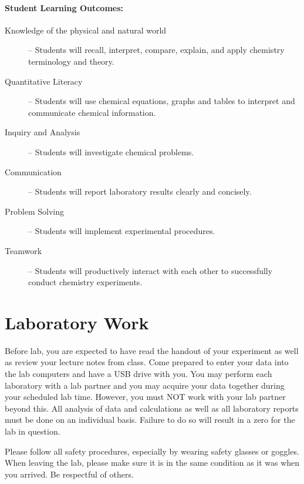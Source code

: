 \documentclass[12pt, letterpaper]{article}
\begin{document}
\paragraph{Student Learning Outcomes:}
\begin{description}
	\item[Knowledge of the physical and natural world] -- Students will recall, interpret, compare, explain, and apply chemistry terminology and theory.
	\item[Quantitative Literacy] -- Students will use chemical equations, graphs and tables to interpret and communicate chemical information.
	\item[Inquiry and Analysis] -- Students will investigate chemical problems.
	\item[Communication] -- Students will report laboratory results clearly and concisely.
	\item[Problem Solving] -- Students will implement experimental procedures.
	\item[Teamwork] -- Students will productively interact with each other to successfully conduct chemistry experiments.
\end{description}

\section*{Laboratory Work}
Before lab, you are expected to have read the handout of your experiment as well as review your lecture notes from class. Come prepared to enter your data into the lab computers and have a USB drive with you. You may perform each laboratory with a lab partner and you may acquire your data together during your scheduled lab time. However, you must NOT work with your lab partner beyond this. All analysis of data and calculations as well as all laboratory reports must be done on an individual basis. Failure to do so will result in a zero for the lab in question. 

\noindent Please follow all safety procedures, especially by wearing safety glasses or goggles. When leaving the lab, please make sure it is in the same condition as it was when you arrived. Be respectful of others.
\end{document}
